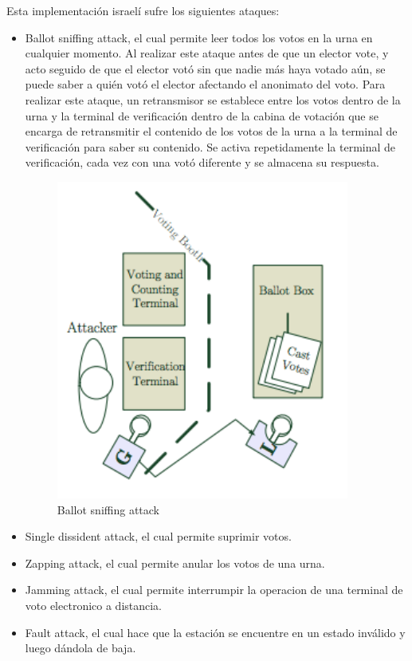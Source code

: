 Esta implementación israelí sufre los siguientes ataques:
\begin{itemize}
	\item Ballot sniffing attack, el cual permite leer todos los votos en la urna en cualquier momento. Al realizar este ataque antes de que un elector vote, y acto seguido de que el elector votó sin que nadie más haya votado aún, se puede saber a quién votó el elector afectando el anonimato del voto.
Para realizar este ataque, un retransmisor se establece entre los votos dentro de la urna y la terminal de verificación dentro de la cabina de votación que se encarga de retransmitir el contenido de los votos de la urna a la terminal de verificación para saber su contenido. Se activa repetidamente la terminal de verificación, cada vez con una votó diferente y se almacena su respuesta.

\begin{figure}[H]
	\centering
	\includegraphics{Imagenes/privacidad3}
	\caption{Ballot sniffing attack}
\end{figure}

	\item Single dissident attack, el cual permite suprimir votos.

	\item Zapping attack, el cual permite anular los votos de una urna.

	\item Jamming attack, el cual permite interrumpir la operacion de una terminal de voto electronico a distancia.

	\item Fault attack, el cual hace que la estación se encuentre en un estado inválido y luego dándola de baja.

\end{itemize}

